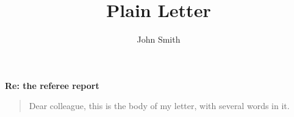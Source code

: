 \documentclass{article}
\title{Plain Letter}\author{John Smith}
\begin{document}
\begin{center}\textbf{Re: the referee report}\end{center}
\begin{quote}
Dear colleague, this is the body of my letter, with several words in it.
\end{quote}
\noindent\@author
\end{document}

